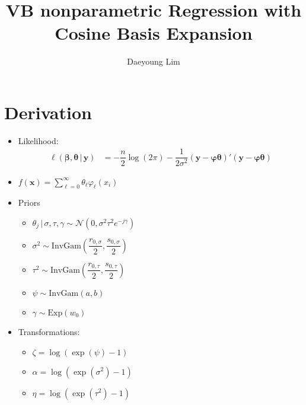 \documentclass[review]{elsarticle}
\begin{document}
\begin{frontmatter}

\title{VB nonparametric Regression with Cosine Basis Expansion}
\author{Daeyoung Lim}


\end{frontmatter}

\linenumbers
\section{Derivation}
\begin{itemize}
  \item Likelihood:
  \begin{align}
    \ell\left(\bm{\beta},\bm{\theta}\,|\,\mathbf{y}\right) &= -\dfrac{n}{2}\log\left(2\pi\right)-\dfrac{1}{2\sigma^{2}}\left(\mathbf{y}-\bm{\varphi\theta}\right)'\left(\mathbf{y}-\bm{\varphi\theta}\right)
  \end{align}
  \item $f(\mathbf{x})=\displaystyle \sum_{\ell=0}^{\infty} \theta_{\ell}\varphi_{\ell}\left(x_{i}\right)$
  \item Priors
  \begin{itemize}
    \item $\theta_{j}\,|\,\sigma,\tau,\gamma \sim \mathcal{N}\left(0,\sigma^{2}\tau^{2}e^{-j\gamma}\right)$
    \item $\sigma^{2} \sim \mathrm{InvGam}\left(\dfrac{r_{0,\sigma}}{2},\dfrac{s_{0,\sigma}}{2}\right)$
    \item $\tau^{2} \sim \mathrm{InvGam}\left(\dfrac{r_{0,\tau}}{2},\dfrac{s_{0,\tau}}{2}\right)$
    \item $\psi \sim \mathrm{InvGam}(a,b)$
    \item $\gamma\sim\mathrm{Exp}\left(w_{0}\right)$
  \end{itemize}
  \item Transformations:
  \begin{itemize}
    \item $\zeta = \log(\exp(\psi)-1)$
    \item $\alpha=\log(\exp(\sigma^{2})-1)$
    \item $\eta = \log(\exp(\tau^{2})-1)$

\end{itemize}
\end{itemize}
\end{document}
